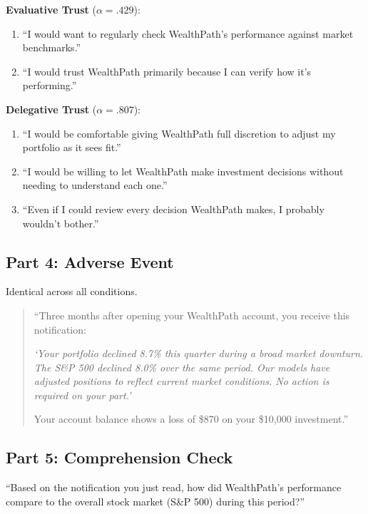 \medskip
\noindent\textbf{Evaluative Trust} ($\alpha = .429$):

\begin{enumerate}[label=\arabic*.]
  \item ``I would want to regularly check WealthPath's performance against market benchmarks.''
  \item ``I would trust WealthPath primarily because I can verify how it's performing.''
\end{enumerate}

\noindent\textbf{Delegative Trust} ($\alpha = .807$):

\begin{enumerate}[label=\arabic*., start=3]
  \item ``I would be comfortable giving WealthPath full discretion to adjust my portfolio as it sees fit.''
  \item ``I would be willing to let WealthPath make investment decisions without needing to understand each one.''
  \item ``Even if I could review every decision WealthPath makes, I probably wouldn't bother.''
\end{enumerate}

\subsection{Part 4: Adverse Event}

Identical across all conditions.

\begin{quote}
``Three months after opening your WealthPath account, you receive this notification:

\medskip
\textit{`Your portfolio declined 8.7\% this quarter during a broad market downturn. The S\&P 500 declined 8.0\% over the same period. Our models have adjusted positions to reflect current market conditions. No action is required on your part.'}

\medskip
Your account balance shows a loss of \$870 on your \$10,000 investment.''
\end{quote}

\subsection{Part 5: Comprehension Check}

\noindent``Based on the notification you just read, how did WealthPath's performance compare to the overall stock market (S\&P 500) during this period?''

